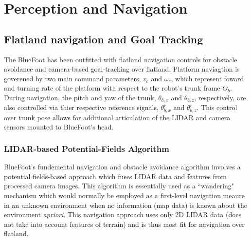 \chapter{Perception and Navigation}
\label{ch::navigation}


	\section{Flatland navigation and Goal Tracking}
	
		The BlueFoot has been outfitted with flatland navigation controls for obstacle avoidance and camera-based goal-tracking over flatland. Platform naviagtion is goverened by two main command parameters, $v_{c}$ and $\omega_{c}$, which represent foward and turning rate of the platform with respect to the robot's trunk frame $O_{b}$. During navigation, the pitch and yaw of the trunk, $\theta_{b,x}$ and $\theta_{b,z}$, respectively, are also controlled via thier respective reference signals, $\theta_{b,x}^{r}$ and $\theta_{b,z}^{r}$. This control over trunk pose allows for additional articulation of the LIDAR and camera sensors mounted to BlueFoot's head. 

		\subsection{LIDAR-based Potential-Fields Algorithm}
		BlueFoot's fundemental navigation and obstacle avoidance algorithm involves a potential fields-based approach which fuses LIDAR data and features from processed camera images. This algorithm is essentially used as a ``wandering" mechanism which would normally be employed as a first-level navigation meaure in an unknown environment when no information (\EG map data) is known about the environment \emph{apriori}. This navigation approach uses only 2D LIDAR data (does not take into account features of terrain) and is thus most fit for navigation over flatland.

